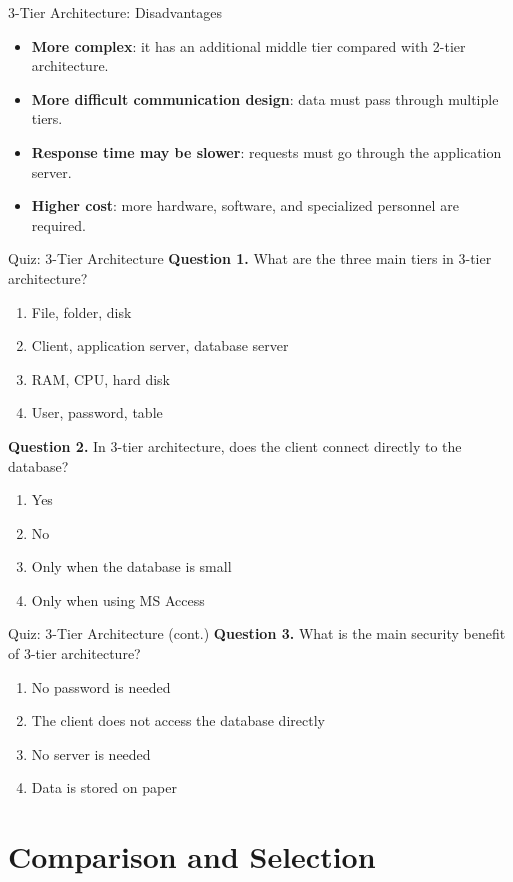 \documentclass[aspectratio=169,11pt]{beamer}
\newcommand{\keyword}[1]{\textcolor{accent}{\textbf{#1}}}
\newcommand{\tightlist}{\setlength{\itemsep}{2pt}\setlength{\parskip}{0pt}}
\newcommand{\qoption}[2]{\item[#1.] #2}
\begin{document}
\begin{frame}{3-Tier Architecture: Disadvantages}
\small
\begin{itemize}
\tightlist
  \item \keyword{More complex}: it has an additional middle tier compared with 2-tier architecture.
  \item \keyword{More difficult communication design}: data must pass through multiple tiers.
  \item \keyword{Response time may be slower}: requests must go through the application server.
  \item \keyword{Higher cost}: more hardware, software, and specialized personnel are required.
\end{itemize}
\end{frame}

\begin{frame}{Quiz: 3-Tier Architecture}
\small
\textbf{Question 1.} What are the three main tiers in 3-tier architecture?
\begin{enumerate}
\tightlist
  \qoption{A}{File, folder, disk}
  \qoption{B}{Client, application server, database server}
  \qoption{C}{RAM, CPU, hard disk}
  \qoption{D}{User, password, table}
\end{enumerate}

\textbf{Question 2.} In 3-tier architecture, does the client connect directly to the database?
\begin{enumerate}
\tightlist
  \qoption{A}{Yes}
  \qoption{B}{No}
  \qoption{C}{Only when the database is small}
  \qoption{D}{Only when using MS Access}
\end{enumerate}
\end{frame}

\begin{frame}{Quiz: 3-Tier Architecture (cont.)}
\small
\textbf{Question 3.} What is the main security benefit of 3-tier architecture?
\begin{enumerate}
\tightlist
  \qoption{A}{No password is needed}
  \qoption{B}{The client does not access the database directly}
  \qoption{C}{No server is needed}
  \qoption{D}{Data is stored on paper}
\end{enumerate}
\end{frame}

\section{Comparison and Selection}
\end{document}
